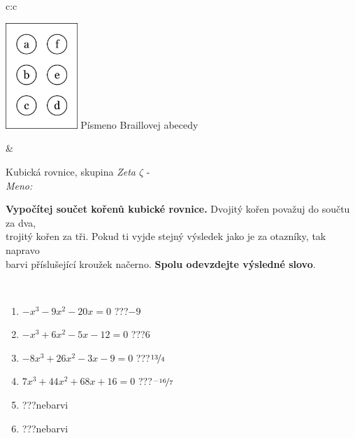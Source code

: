 \documentclass[10pt]{report}
\begin{document}
\begin{tabular}{c:c}
\begin{minipage}[c][104.5mm][t]{0.5\linewidth}
\begin{center}
\begin{minipage}{0.20\linewidth}
\begin{center}
\includegraphics[height=40mm]{../images/braille.png}
{\small Písmeno Braillovej abecedy}
\end{center}
\end{minipage}
\end{center}
\end{minipage}
&
\begin{minipage}[c][104.5mm][t]{0.5\linewidth}
\begin{center}
\vspace{7mm}
{\huge Kubická rovnice, skupina \textit{Zeta $\zeta$} -}\\[5mm]
\textit{Meno:}\phantom{xxxxxxxxxxxxxxxxxxxxxxxxxxxxxxxxxxxxxxxxxxxxxxxxxxxxxxxxxxxxxxxxx}\\[5mm]
\begin{minipage}{0.95\linewidth}
\textbf{Vypočítej součet kořenů kubické rovnice.} Dvojitý kořen považuj do součtu za dva,\\trojitý kořen za tři. Pokud ti vyjde stejný výsledek jako je za otazníky, tak napravo\\barvi příslušející kroužek načerno. \textbf{Spolu odevzdejte výsledné slovo}.
\end{minipage}
\\[1mm]
\begin{minipage}{0.79\linewidth}
\begin{center}
\begin{varwidth}{\linewidth}
\begin{enumerate}
\Large
\item $-x^3-9x^2-20x=0$\quad \dotfill\; ???\;\dotfill \quad $-9$
\item $-x^3+6x^2-5x-12=0$\quad \dotfill\; ???\;\dotfill \quad $6$
\item $-8x^3+26x^2-3x-9=0$\quad \dotfill\; ???\;\dotfill \quad $\nicefrac{13}{4}$
\item $7x^3+44x^2+68x+16=0$\quad \dotfill\; ???\;\dotfill \quad $\nicefrac{-16}{7}$
\item \quad \dotfill\; ???\;\dotfill \quad nebarvi
\item \quad \dotfill\; ???\;\dotfill \quad nebarvi
\end{enumerate}

\end{varwidth}
\end{center}
\end{minipage}
\end{center}
\end{minipage}
\end{tabular}
\end{document}
